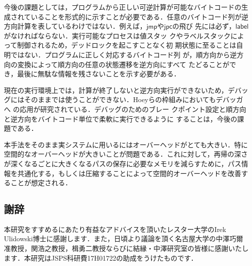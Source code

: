 \documentclass[submit,PRO]{ipsj}
\newcommand{\bcode}[1]{$\mathsf{#1}$}
\begin{document}
今後の課題としては，プログラムから正しい可逆計算が可能なバイトコードの生
成されていることを形式的に示すことが必要である．任意のバイトコード列が逆
方向計算を表しているわけではない．例えば，\bcode{jmp}や\bcode{jpc}の飛び
先には必ず，\bcode{label}がなければならない．実行可能なプロセスは値スタッ
クやラベルスタックによって制御されるため，デッドロックを起こすことなく初
期状態に至ることは自明ではない．プログラムに正しく対応するバイトコード列
が，順方向から逆方向の変換によって順方向の任意の状態遷移を逆方向にすべて
たどることができ，最後に無駄な情報を残さないことを示す必要がある．

現在の実行環境上では，計算が終了しないと逆方向実行ができないため，デバッ
グにはそのままでは使うことができない．Hoeyらの枠組みにおいてもデバッガへ
の応用が研究されている\cite{DBLP:conf/rc/HoeyU19}．デバッグのためのブレー
クポイント設定と順方向と逆方向をバイトコード単位で柔軟に実行できるように
することは，今後の課題である．

本手法をそのまま実システムに用いるにはオーバーヘッドがとても大きい．特に空間的なオーバーヘッドが大きいことが問題である．これに対して，再帰の深さが深くなるごとに大きくなるパスの保存に必要なメモリを減らすために，パス情報を共通化する，もしくは圧縮することによって空間的オーバーヘッドを改善することが想定される．

\subsection*{謝辞}

本研究をすすめるにあたり有益なアドバイスを頂いたレスター大学のIrek
Ulidowski博士に感謝します．また，日頃より議論を頂く名古屋大学の中澤巧爾
准教授，関浩之教授，楫勇二教授ならびに結縁・中澤研究室の皆様に感謝いたし
ます．本研究はJSPS科研費17H01722の助成をうけたものです．



\end{document}

